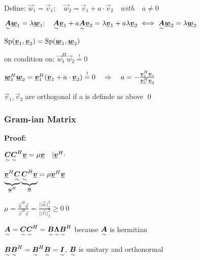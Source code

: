 Define: $\vec{w}_1=\vec{v}_1; \quad \vec{w}_2=\vec{v}_1 + a\cdot\vec{v}_2 \quad with \quad a\neq 0$

$\ma{A}\vec{w}_1=\lambda\vec{w}_1;\quad \ma{A}\vec{v}_1+a\ma{A}\vec{v}_2=\lambda\vec{v}_1+a\lambda\vec{v}_2 \iff \ma{A}\vec{w}_2=\lambda\vec{w}_2$

$\Sp(\vec{v}_1,\vec{v}_2)=\Sp(\vec{w}_1,\vec{w}_2)$

on condition on: $\vec{w}_1^H\vec{w}_2\overset{!}{=}0$

$\vec{w}_1^H\vec{w}_2=\vec{v}_1^H(\vec{v}_1+a\cdot\vec{v}_2)\overset{!}{=}0 \pfeil  a=-\frac{\vec{v}_1^H\vec{v}_1}{\vec{v}_1^H\vec{v}_2}$

$\vec{v}_1, \vec{v}_2$ are orthogonal if a is definde as above
\qed


\subsubsection{Gram-ian Matrix}\label{sec:Gramian_matrix}

\textbf{Proof:} 

$\ma{C}\ma{C}^H\vec{v}=\mu\vec{v} \quad | \vec{v}^H\cdot$

$\underbrace{\vec{v}^H\ma{C}}_{\vec{a}^H}\underbrace{\ma{C}^H\vec{v}}_{\vec{a}}=\mu\vec{v}^H\vec{v}$
 
$\mu=\frac{\vec{a}^H\vec{a}}{\vec{v}^H\vec{v}}=\frac{||\vec{a}||_2^2}{||\vec{v}||_2^2 }\geq 0$\qed


$\ma{A}=\ma{C}\ma{C}^H=\ma{B}\ma{\Lambda}\ma{B}^H$ because $\ma{A}$ is hermitian

$\ma{B}\ma{B}^H=\ma{B}^H\ma{B}=\ma{I}$, \quad $\ma{B}$ is unitary and orthonormal





